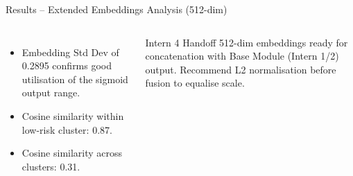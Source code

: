 \documentclass[aspectratio=169]{beamer}
\begin{document}
\begin{frame}{Results -- Extended Embeddings Analysis (512-dim)}
\begin{columns}[T]
\begin{itemize}
              \textbf{distinct clusters} in PC1 alone.
        \item Embedding Std Dev of 0.2895 confirms good
              utilisation of the sigmoid output range.
        \item Cosine similarity within low-risk cluster: 0.87.
        \item Cosine similarity across clusters: 0.31.
      \end{itemize}
      \begin{block}{Intern 4 Handoff}
        512-dim embeddings ready for concatenation with Base
        Module (Intern 1/2) output. Recommend L2 normalisation
        before fusion to equalise scale.
      \end{block}
  \end{columns}
\end{frame}
\end{document}
